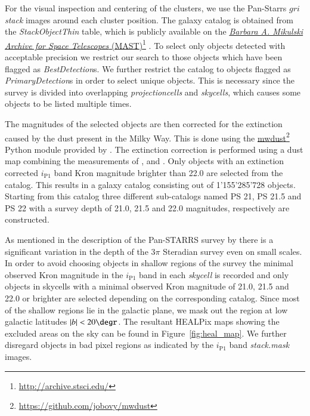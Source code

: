 \documentclass[iop, apjl, twocolappendix, numberedappendix]{emulateapj}
\newcommand\fnurl[2]{%
  \href{#2}{#1}\footnote{\url{#2}}%
}
\begin{document}
For the visual inspection and centering of the clusters, we use the
Pan-Starrs $gri$ \textit{stack} images around each cluster position.
The galaxy catalog is obtained from the  \textit{StackObjectThin}
table, which is publicly available on the \fnurl{\textit{Barbara A.
Mikulski Archive for Space Telescopes}
(MAST)}{http://archive.stsci.edu/}. To select only objects detected
with acceptable precision we restrict our search to those objects
which have been flagged as \textit{BestDetection}s. We further
restrict the catalog to objects flagged as
\textit{PrimaryDetection}s in order to select unique objects. This
is necessary since the survey is divided into overlapping
\textit{projectioncells} and \textit{skycells}, which causes some objects
to be listed multiple times.

The magnitudes of the selected objects are then corrected for the
extinction caused by the dust present in the Milky Way. This is done
using the \fnurl{mwdust}{https://github.com/jobovy/mwdust} Python
module provided by \citet{bovy2016galactic}. The extinction
correction is performed using a dust map combining the measurements
of \citet{marshall2006modelling}, \citet{green2015three} and
\citet{drimmel2003three}. Only objects with an extinction corrected
$i_{\mathrm{P1}}$ band Kron magnitude brighter than 22.0 are
selected from the catalog. This results in a galaxy catalog
consisting out of 1'155'285'728 objects. Starting from this catalog
three different sub-catalogs named PS 21, PS 21.5 and PS 22 with a
survey depth of 21.0, 21.5 and 22.0 magnitudes, respectively are
constructed.

As mentioned in the description of the Pan-STARRS survey by
\citet{chambers2016pan} there is a significant variation in the
depth of the 3$\pi$ Steradian survey even on small scales. In order
to avoid choosing objects in shallow regions of the survey the
minimal observed Kron magnitude in the $i_{\mathrm{P1}}$ band in
each \textit{skycell} is recorded and only objects in skycells with
a minimal observed Kron magnitude of 21.0, 21.5 and 22.0 or brighter
are selected depending on the corresponding catalog. Since most of
the shallow regions lie in the galactic plane, we mask out the
region at low galactic latitudes $|b|<20\degr$. The resultant
HEALPix maps showing the excluded areas on the sky can be found in
Figure~\ref{fig:heal_map}. We further disregard objects in bad
pixel regions as indicated by the $i_{\mathrm{P1}}$ band
\textit{stack.mask} images.
\end{document}
